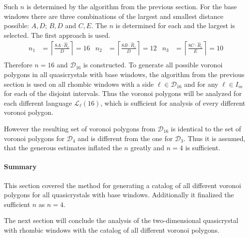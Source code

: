 \documentclass[text.tex]{subfiles}
\begin{document}
Such $n$ is determined by the algorithm from the previous section. For the base windows there are three combinations of the largest and smallest distance possible: $A,D$; $B,D$ and $C,E$. The $n$ is determined for each and the largest is selected. The first approach is used. 
\begin{align*}
n_1 &= \left\lceil\frac{8A\cdot\hat{R}_c}{D}\right\rceil = 16 & n_2 &= \left\lceil\frac{8B\cdot\hat{R}_c}{D}\right\rceil = 12 & n_3 &= \left\lceil\frac{8C\cdot\hat{R}_c}{E}\right\rceil = 10\\
\end{align*}
Therefore $n=16$ and $\mathcal{D}_{16}$ is constructed. To generate all possible voronoi polygons in all quasicrystals with base windows, the algorithm from the previous section is used on all rhombic windows with a side $\ell\in\mathcal{D}_{16}$ and for any $\ell\in I_m$ for each of the disjoint intervals. Thus the voronoi polygons will be analyzed for each different language $\mathcal{L}_\ell(16)$, which is sufficient for analysis of every different voronoi polygon. 

However the resulting set of voronoi polygons from $\mathcal{D}_{16}$ is identical to the set of voronoi polygons for $\mathcal{D}_4$ and is different from the one for $\mathcal{D}_3$. Thus it is assumed, that the generous estimates inflated the $n$ greatly and $n=4$ is sufficient.

\paragraph{Summary} This section covered the method for generating a catalog of all different voronoi polygons for all quasicrystals with base windows. Additionally it finalized the sufficient $n$ as $n=4$.

The next section will conclude the analysis of the two-dimensional quasicrystal with rhombic windows with the catalog of all different voronoi polygons.

\clearpage
\end{document}
